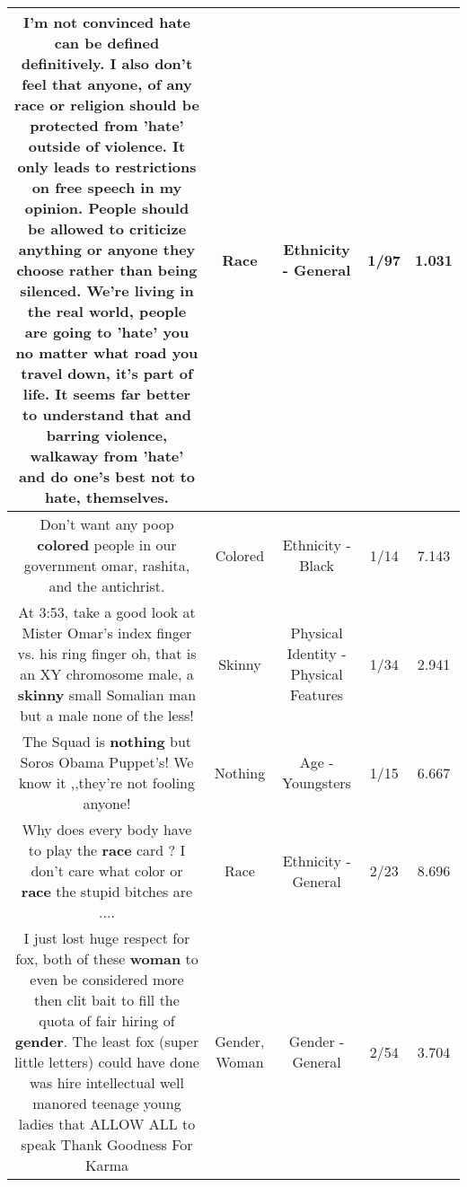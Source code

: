 \documentclass[11pt]{article}
\newlength\mylength
\begin{document}
\begin{center}
\begin{longtable}{|C{.65\mylength}|C{.30\mylength}|C{.12\mylength}|C{.12\mylength}|C{.12\mylength}|}
  \small I'm not convinced hate can be defined definitively.  I also don't feel that anyone, of any \textbf{race} or religion should be protected from 'hate' outside of violence.  It only leads to restrictions on free speech in my opinion.  People should be allowed to criticize anything or anyone they choose rather than being silenced.  We're living in the real world, people are going to 'hate' you no matter what road you travel down, it's part of life.  It seems far better to understand that and barring violence, walkaway from 'hate' and do one's best not to hate, themselves.\normalsize   & Race & Ethnicity - General & 1/97 & 1.031 \\  \hline
  \small Don't want any poop \textbf{colored}  people in our government  omar, rashita, and the antichrist.\normalsize   & Colored & Ethnicity - Black & 1/14 & 7.143 \\  \hline
  \small At 3:53, take a good look at Mister Omar's index finger vs. his ring finger oh, that is an XY chromosome male, a \textbf{skinny} small Somalian man but a male none of the less!\normalsize   & Skinny & Physical Identity - Physical Features & 1/34 & 2.941 \\  \hline
  \small The Squad is \textbf{nothing} but Soros Obama Puppet's! We know it ,,they're not fooling anyone!\normalsize   & Nothing & Age - Youngsters & 1/15 & 6.667 \\  \hline
  \small Why does every body have to play the \textbf{race} card ?  I don't care what color or \textbf{race} the stupid bitches are ....\normalsize   & Race & Ethnicity - General & 2/23 & 8.696 \\  \hline
  \small I just lost huge respect for fox, both of these \textbf{woman} to even be considered more then clit bait to fill the quota of fair hiring of \textbf{gender}. The least fox (super little letters) could have done was hire intellectual well manored teenage young ladies that ALLOW ALL to speak Thank Goodness For Karma\normalsize   & Gender, Woman & Gender - General & 2/54 & 3.704 \\  \hline

\end{longtable}
\end{center}
\end{document}
